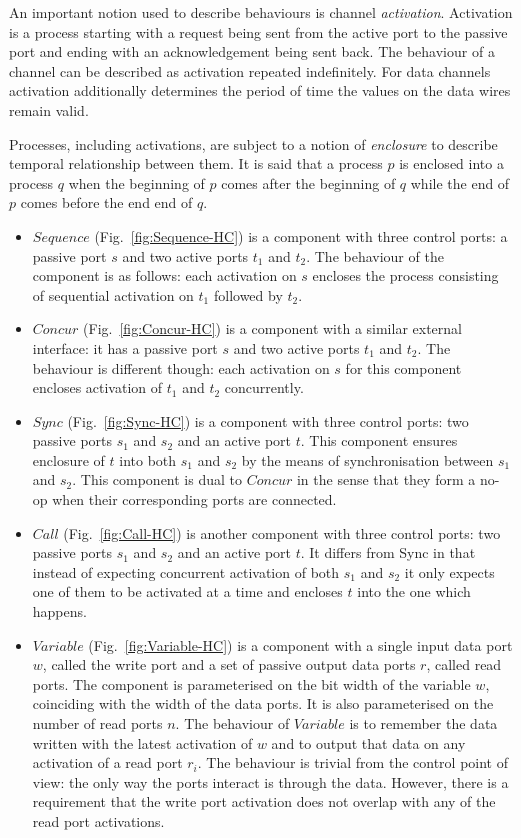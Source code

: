 An important notion used to describe behaviours is channel \emph{activation}. Activation is a process 
starting with a request being sent from the active port to the passive port and ending with an acknowledgement being sent back.
The behaviour of a channel can be described as activation repeated indefinitely. For data channels activation additionally determines 
the period of time the values on the data wires remain valid.

Processes, including activations, are subject to a notion of \emph{enclosure} to describe temporal relationship between them. 
It is said that a process $p$ is enclosed into a process $q$ when the beginning of $p$ comes after the beginning of $q$ while the end of $p$ comes before the end end of $q$.

\begin{itemize}
\item
$Sequence$ (Fig.~\ref{fig:Sequence-HC}) is a component with three control ports: a passive port $s$ and two active ports $t_1$ and $t_2$.
The behaviour of the component is as follows: each activation on $s$ encloses the process consisting of sequential activation on $t_1$ followed by $t_2$.

\item
$Concur$ (Fig.~\ref{fig:Concur-HC}) is a component with a similar external interface: it has a passive port $s$ and two active ports $t_1$ and $t_2$.
The behaviour is different though: each activation on $s$ for this component encloses activation of $t_1$ and $t_2$ concurrently.

\item
$Sync$ (Fig.~\ref{fig:Sync-HC}) is a component with three control ports: two passive ports $s_1$ and $s_2$ and an active port $t$.
This component ensures enclosure of $t$ into both $s_1$ and $s_2$ by the means of synchronisation between $s_1$ and $s_2$. This component is dual 
to $Concur$ in the sense that they form a no-op when their corresponding ports are connected.

\item
$Call$ (Fig.~\ref{fig:Call-HC}) is another component with three control ports: two passive ports $s_1$ and $s_2$ and an active port $t$.
It differs from Sync in that instead of expecting concurrent activation of both $s_1$ and $s_2$ it only expects one of them to be activated at a time and encloses $t$ into the one which happens.

\item
$Variable$ (Fig.~\ref{fig:Variable-HC}) is a component with a single input data port $w$, called the write port and a set of passive output data ports $r$, called read ports. 
The component is parameterised on the bit width of the variable $w$, coinciding with the width of the data ports. It is also parameterised on the number of read ports $n$. 
The behaviour  of $Variable$ is to remember the data written with the latest activation of $w$ and to output that data on any activation of a read port $r_i$.
The behaviour is trivial from the control point of view: the only way the ports interact is through the data. However, there is a requirement that the write port activation does not overlap with any of the read port activations.


\end{itemize}
